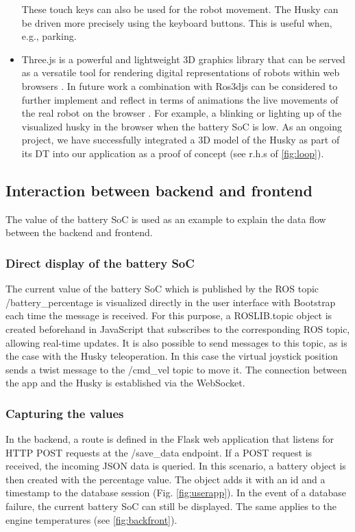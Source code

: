 \documentclass[conference]{IEEEtran}
\begin{document}
\begin{itemize}
These touch keys can also be used for the robot movement. The Husky can be driven more precisely using the keyboard buttons. This is useful when, e.g., parking.
\item Three.js is a powerful and lightweight 3D graphics library that can be served as a versatile tool for rendering digital representations of robots within web browsers \cite{threejs}. In future work a combination with Ros3djs can be considered to further implement and reflect in terms of animations the live movements of the real robot on the browser \cite{ros3djs}. For example, a blinking or lighting up of the visualized husky in the browser when the battery SoC is low. 
As an ongoing project, we have successfully integrated a 3D model  of the Husky as part of its DT into our application as a proof of concept (see r.h.s of \cref{fig:loop}). 
\end{itemize}

\subsection{Interaction between backend and frontend}
The value of the battery SoC is used as an example to explain the data flow between the backend and frontend. 
\subsubsection{Direct display of the battery SoC}
The current value of the battery SoC which is published by the ROS topic /battery\_percentage is visualized directly in the user interface with Bootstrap each time the message is received. For this purpose, a ROSLIB.topic object is created beforehand in JavaScript that subscribes to the corresponding ROS topic, allowing real-time updates. It is also possible to send messages to this topic, as is the case with the Husky teleoperation. 
In this case the virtual joystick position sends a twist message to the /cmd\_vel topic to move it. 
The connection between the app and the Husky is established via the WebSocket. 
\subsubsection{Capturing the values}
In the backend, a route is defined in the Flask web application that listens for HTTP POST requests at the /save\_data endpoint. If a POST request is received, the incoming JSON data is queried. In this scenario, a battery object is then created with the percentage value. The object adds it with an id and a timestamp to the database session (Fig. \ref{fig:userapp}). In the event of a database failure, the current battery SoC can still be displayed. The same applies to the engine temperatures (see \cref{fig:backfront}).
\end{document}
